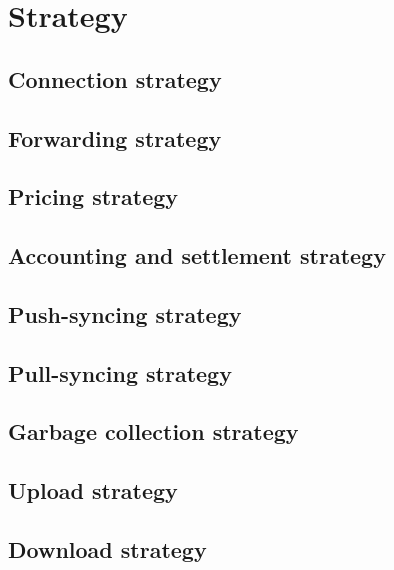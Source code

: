 \chapter{Strategy}\label{spec:strategy:}
\section{Connection strategy}\label{spec:strategy:connection}
%
\section{Forwarding strategy}\label{spec:strategy:forwarding}

\section{Pricing strategy}\label{spec:strategy:pricing}

\section{Accounting and settlement strategy}\label{spec:strategy:swap}

\section{Push-syncing strategy}\label{spec:strategy:push-sync}

\section{Pull-syncing strategy}\label{spec:strategy:pull-sync}

\section{Garbage collection strategy}\label{spec:strategy:garbage-collection}

\section{Upload strategy}\label{spec:strategy:upload}

\section{Download strategy}\label{spec:strategy:download}


